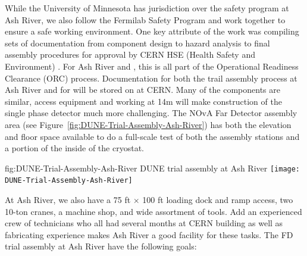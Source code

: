 While the University of Minnesota has jurisdiction over the safety program at Ash River, we also follow the Fermilab Safety Program and work together to ensure a safe working environment.  One key attribute of the  work was compiling sets of documentation from component design to hazard analysis to final assembly procedures for approval by CERN HSE (Health Safety and Environment) . For Ash River and , this is all part of the Operational Readiness Clearance (ORC)  process. Documentation for both the trail assembly process at Ash River and for  will be stored on  at CERN. 
Many of the  components are similar, access equipment and working at 14m  will make construction of the  single phase detector much more challenging.   The NOvA Far Detector assembly area (see Figure~\ref{fig:DUNE-Trial-Assembly-Ash-River}) has both the elevation and floor space available to do a full-scale test of both the assembly stations and a portion of the inside of the  cryostat. 

\begin{dunefigure} %
{fig:DUNE-Trial-Assembly-Ash-River}  %
{DUNE trial assembly at Ash River}  %
\centering
\texttt{[image: DUNE-Trial-Assembly-Ash-River]}
\end{dunefigure}

At Ash River, we also have a 75 \si{ft} $\times$  100 \si{ft} loading dock and ramp access, two 10-ton cranes, a machine shop, and wide assortment of tools.  Add an experienced crew of technicians who all had several months at CERN building  as well as fabricating experience makes Ash River a good facility for these tasks. 
The  FD  trial assembly at Ash River have the following goals:

